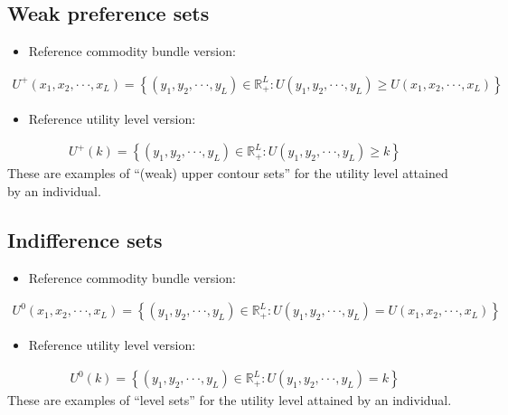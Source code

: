\documentclass[letterpaper,10pt,english]{jupyterBook}
\begin{document}
\subsection{Weak preference sets}
\label{\detokenize{02.sets_numbers_coordinates_distances:weak-preference-sets}}\begin{itemize}
\item {} 
\sphinxAtStartPar
Reference commodity bundle version:

\end{itemize}
\begin{equation*}
\begin{split}U^+(x_1, x_2, · · · , x_L) =
\left\{
(y_1, y_2, · · · , y_L) \in \mathbb{R}^L_+ : U(y_1, y_2, · · · , y_L) \geqslant U (x_1, x_2, · · · , x_L)
\right\}\end{split}
\end{equation*}\begin{itemize}
\item {} 
\sphinxAtStartPar
Reference utility level version:

\end{itemize}
\begin{equation*}
\begin{split}U^+(k) =
\left\{
(y_1, y_2, · · · , y_L) \in \mathbb{R}^L_+ : U(y_1, y_2, · · · , y_L) \geqslant k
\right\}\end{split}
\end{equation*}
\sphinxAtStartPar
These are examples of “(weak) upper contour sets” for the utility level attained by an individual.

\sphinxAtStartPar
{}


\subsection{Indifference sets}
\label{\detokenize{02.sets_numbers_coordinates_distances:indifference-sets}}\begin{itemize}
\item {} 
\sphinxAtStartPar
Reference commodity bundle version:

\end{itemize}
\begin{equation*}
\begin{split}U^0(x_1, x_2, · · · , x_L) =
\left\{
(y_1, y_2, · · · , y_L) \in \mathbb{R}^L_+ : U(y_1, y_2, · · · , y_L) = U(x_1, x_2, · · · , x_L)
\right\}\end{split}
\end{equation*}\begin{itemize}
\item {} 
\sphinxAtStartPar
Reference utility level version:

\end{itemize}
\begin{equation*}
\begin{split}U^0(k) =
\left\{
(y_1, y_2, · · · , y_L) \in \mathbb{R}^L_+ : U(y_1, y_2, · · · , y_L) = k
\right\}\end{split}
\end{equation*}
\sphinxAtStartPar
These are examples of “level sets” for the utility level attained by an individual.
\end{document}
